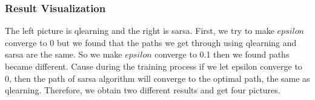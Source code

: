 \documentclass[aps,letterpaper,10pt]{revtex4}
\begin{document}
\subsubsection{Result Visualization}
\begin{figure}[H]
	  \centering
	  \label{fig:oscil}
	\end{figure}
The left picture is qlearning and the right is sarsa.
First, we try to make $epsilon$ converge to 0 but we found that the paths we get through using qlearning and sarsa are the same. So we make $epsilon$ converge to 0.1 then we found paths became different. Cause during the training process if we let epsilon converge to 0, then the path of sarsa algorithm will converge to the optimal path, the same as qlearning. Therefore, we obtain two different results and get four pictures.
\begin{figure}[H]
	  \centering
	  \label{fig:oscil}
	\end{figure}
\begin{figure}[H]
	  \centering
	  \label{fig:oscil}
	\end{figure}
\end{document}
